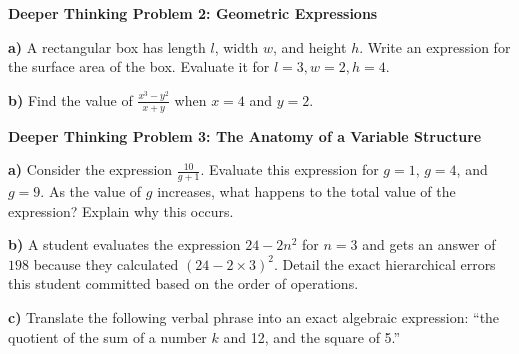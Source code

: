 \documentclass[12pt, letterpaper, fleqn]{article}
\begin{document}
\begin{tcolorbox}[colback=white, colframe=black, boxrule=1pt, arc=4mm, left=6mm, right=6mm, top=5mm, bottom=5mm]
\textbf{Deeper Thinking Problem 2: Geometric Expressions}

\medskip

\noindent
\textbf{a)} A rectangular box has length $l$, width $w$, and height $h$. Write an expression for the surface area of the box. Evaluate it for $l = 3, w = 2, h = 4$.

\vspace{2cm}

\noindent
\textbf{b)} Find the value of $\frac{x^3 - y^2}{x + y}$ when $x = 4$ and $y = 2$.
\vspace{3cm}
\end{tcolorbox}

\newpage

\begin{tcolorbox}[colback=white, colframe=black, boxrule=1pt, arc=4mm, left=6mm, right=6mm, top=5mm, bottom=5mm]
\textbf{Deeper Thinking Problem 3: The Anatomy of a Variable Structure}

\medskip

\noindent
\textbf{a)} Consider the expression $\frac{10}{g+1}$. Evaluate this expression for $g = 1$, $g = 4$, and $g = 9$. As the value of $g$ increases, what happens to the total value of the expression? Explain why this occurs.

\vspace{5cm}

\noindent
\textbf{b)} A student evaluates the expression $24 - 2n^2$ for $n = 3$ and gets an answer of $198$ because they calculated $(24 - 2 \times 3)^2$. Detail the exact hierarchical errors this student committed based on the order of operations.

\vspace{5cm}

\noindent
\textbf{c)} Translate the following verbal phrase into an exact algebraic expression: ``the quotient of the sum of a number $k$ and 12, and the square of 5.''

\vspace{5cm}
\end{tcolorbox}
\end{document}
